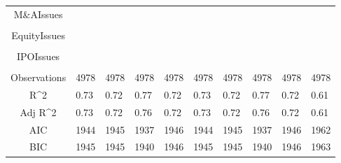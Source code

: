 \documentclass{article}
\begin{document}
\begin{table}[H]
\begin{tabular}{|clllllllll|}
  M\&AIssues &  &  &  &  &  &  &  &  &  \\ 
   &  &  &  &  &  &  &  &  &  \\ 
  EquityIssues &  &  &  &  &  &  &  &  &  \\ 
   &  &  &  &  &  &  &  &  &  \\ 
  IPOIssues &  &  &  &  &  &  &  &  &  \\ 
   &  &  &  &  &  &  &  &  &  \\ 
  \hline 
 Observations & 4978 & 4978 & 4978 & 4978 & 4978 & 4978 & 4978 & 4978 & 4978 \\ 
  R^2 & 0.73 & 0.72 & 0.77 & 0.72 & 0.73 & 0.72 & 0.77 & 0.72 & 0.61 \\ 
  Adj R^2 & 0.73 & 0.72 & 0.76 & 0.72 & 0.73 & 0.72 & 0.76 & 0.72 & 0.61 \\ 
  AIC & 1944 & 1945 & 1937 & 1946 & 1944 & 1945 & 1937 & 1946 & 1962 \\ 
  BIC & 1945 & 1945 & 1940 & 1946 & 1945 & 1945 & 1940 & 1946 & 1963 \\ 
   \hline
\end{tabular}
 
\end{table}
\end{document}
